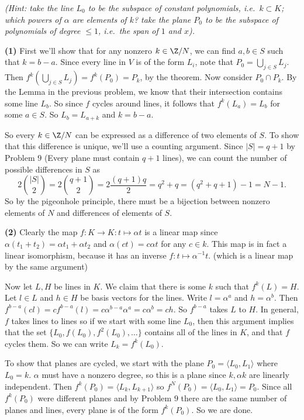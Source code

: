 \textit{(Hint: take the line $L_0$ to be the subspace of constant polynomials,
i.e.\ $k\subset K$; which powers of $\alpha$ are elements of $k$?
take the plane $P_0$ to be the subspace of polynomials of degree $\leq 1$,
i.e.\ the span of $1$ and $x$).}

\textbf{(1)} First we'll show that for any nonzero $k\in \Z / N$, we can find $a,b\in S$ such that $k=b-a$. Since every line in $V$ is of the form $L_i$, note that $P_0=\bigcup_{j\in S}L_j$. Then $f^k\left(\bigcup_{j\in S}L_j\right)=f^k(P_0)=P_k$, by the theorem. Now consider $P_0\cap P_k$. By the Lemma in the previous problem, we know that their intersection contains some line $L_b$. So since $f$ cycles around lines, it follows that $f^k(L_a) = L_b$ for some $a\in S$. So $L_b=L_{a+k}$ and $k=b-a$.

So every $k\in \Z /N$ can be expressed as a difference of two elements of $S$. To show that this difference is unique, we'll use a counting argument. Since $|S|=q+1$ by Problem $9$ (Every plane must contain $q+1$ lines), we can count the number of possible differences in $S$ as 
\[
  2 \binom{|S|}{2}=2\binom{q+1}{2}= {2\frac{(q+1)q}{2}}=q^2+q=(q^2+q+1)-1=N-1
.\]
So by the pigeonhole principle, there must be a bijection between nonzero elements of $N$ and differences of elements of $S$.


\textbf{(2)} Clearly the map $f : K \to K : t \mapsto \alpha t$ is a linear map since $\alpha(t_1+t_2)=\alpha t_1+\alpha t_2$ and $\alpha(ct)=c\alpha t$ for any $c\in k$. This map is in fact a linear isomorphism, because it has an inverse $f : t \mapsto \alpha^{-1}t$. (which is a linear map by the same argument) 

Now let $L,H$ be lines in $K$. We claim that there is some $k$ such that $f^k(L)=H$. Let $l\in L$ and $h\in H$ be basis vectors for the lines. Write $l=\alpha^a$ and $h=\alpha^b$. Then $f^{b-a}(cl)=cf^{b-a}(l)=c\alpha^{b-a}\alpha^a=c\alpha^b=ch$. So $f^{b-a}$ takes $L$ to $H$. In general, $f$ takes lines to lines so if we start with some line $L_0$, then this argument implies that the set $\{L_0, f(L_0), f^2(L_0),\ldots\}$ contains all of the lines in $K$, and that $f$ cycles them. So we can write $L_k=f^k(L_0)$. 

To show that planes are cycled, we start with the plane $P_0=\big\langle L_0, L_1\big\rangle$ where $L_0=k$. $\alpha$ must have a nonzero degree, so this is a plane since $k, \alpha k$ are linearly independent. Then $f^k(P_0)=\big\langle L_k, L_{k+1} \big\rangle$ so $f^N(P_0)=\big\langle L_0, L_1 \big\rangle = P_0$. Since all $f^k(P_0)$ were different planes and by Problem $9$ there are the same number of planes and lines, every plane is of the form $f^k(P_0)$. So we are done.      